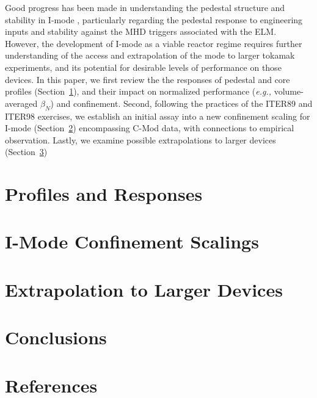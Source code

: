 \documentclass[12pt]{iopart}
\newcommand{\eg}{\emph{e.g., }}
\begin{document}
Good progress has been made in understanding the pedestal structure and stability in I-mode \cite{Walk2014,Walk2014b}, particularly regarding the pedestal response to engineering inputs and stability against the MHD triggers associated with the ELM.
However, the development of I-mode as a viable reactor regime requires further understanding of the access and extrapolation of the mode to larger tokamak experiments, and its potential for desirable levels of performance on those devices.
In this paper, we first review the the responses of pedestal and core profiles (Section~\ref{sec:profiles}), and their impact on normalized performance (\eg volume-averaged $\beta_N$) and confinement.
Second, following the practices of the ITER89 \cite{Christiansen1992,Yushmanov1990} and ITER98 \cite{ITER1999} exercises, we establish an initial assay into a new confinement scaling for I-mode (Section~\ref{sec:scalings}) encompassing C-Mod data, with connections to empirical observation.
Lastly, we examine possible extrapolations to larger devices (Section~\ref{sec:extrap})

\section{Profiles and Responses}\label{sec:profiles}

\section{I-Mode Confinement Scalings}\label{sec:scalings}

\section{Extrapolation to Larger Devices}\label{sec:extrap}

\section{Conclusions}\label{sec:conclusion}

\section*{References}


\end{document}
